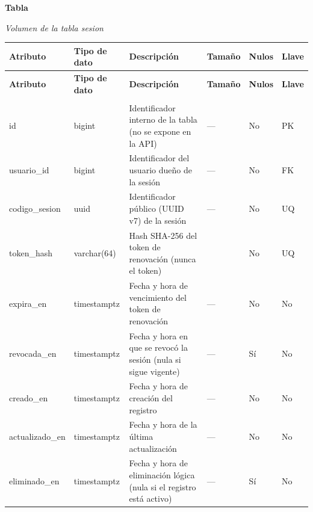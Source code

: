 \label{tab:volumen_sesion}
\noindent\textbf{Tabla~\thetable}\par\nopagebreak
\noindent\textit{Volumen de la tabla sesion}\par\nopagebreak
\begingroup\small\linespread{1}\selectfont\setlength{\tabcolsep}{4pt}
\begin{longtable}{>{\raggedright\arraybackslash}p{3.4cm} >{\raggedright\arraybackslash}p{2.5cm} >{\raggedright\arraybackslash}p{4.8cm} >{\centering\arraybackslash}p{1.6cm}>{\centering\arraybackslash}p{1.1cm} >{\centering\arraybackslash}p{1.3cm}}
\toprule
\textbf{Atributo} & \textbf{Tipo de dato} & \textbf{Descripción} & \textbf{Tamaño} & \textbf{Nulos} & \textbf{Llave} \\
\midrule
\endfirsthead
\toprule
\textbf{Atributo} & \textbf{Tipo de dato} & \textbf{Descripción} & \textbf{Tamaño} & \textbf{Nulos} & \textbf{Llave} \\
\midrule
\endhead
\endfoot
\bottomrule
\multicolumn{6}{l}{\textit{Nota.} Elaboración propia.} \\
\endlastfoot
id & bigint & Identificador interno de la tabla (no se expone en la API) & — & No & PK \\
usuario\_\allowbreak{}id & bigint & Identificador del usuario dueño de la sesión & — & No & FK \\
codigo\_\allowbreak{}sesion & uuid & Identificador público (UUID v7) de la sesión & — & No & UQ \\
token\_\allowbreak{}hash & varchar(64) & Hash SHA-256 del token de renovación (nunca el token) & 64 & No & UQ \\
expira\_\allowbreak{}en & timestamptz & Fecha y hora de vencimiento del token de renovación & — & No & No \\
revocada\_\allowbreak{}en & timestamptz & Fecha y hora en que se revocó la sesión (nula si sigue vigente) & — & Sí & No \\
creado\_\allowbreak{}en & timestamptz & Fecha y hora de creación del registro & — & No & No \\
actualizado\_\allowbreak{}en & timestamptz & Fecha y hora de la última actualización & — & No & No \\
eliminado\_\allowbreak{}en & timestamptz & Fecha y hora de eliminación lógica (nula si el registro está activo) & — & Sí & No \\
\end{longtable}
\endgroup
\addtocounter{table}{-1}

